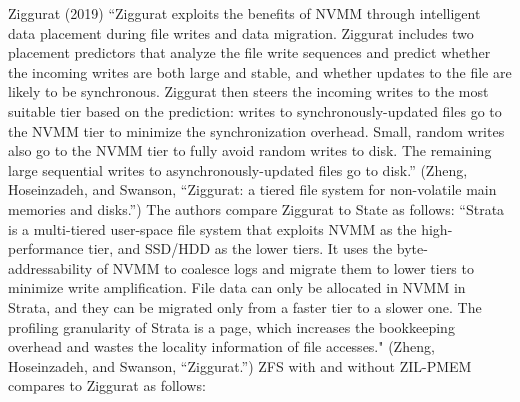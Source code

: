 \documentclass[12pt,a4paper,twoside,draft]{book}
\begin{document}
Ziggurat (2019)
  “Ziggurat exploits the benefits of NVMM through intelligent data placement during file writes and data migration.
  Ziggurat includes two placement predictors that analyze the file write sequences and predict whether the incoming writes are both large and stable, and whether updates to the file are likely to be synchronous.
  Ziggurat then steers the incoming writes to the most suitable tier based on the prediction: writes to synchronously-updated files go to the NVMM tier to minimize the synchronization overhead.
  Small, random writes also go to the NVMM tier to fully avoid random writes to disk. The remaining large sequential writes to asynchronously-updated files go to disk.”
  (Zheng, Hoseinzadeh, and Swanson, “Ziggurat: a tiered file system for non-volatile main memories and disks.”)
The authors compare Ziggurat to State as follows:
  “Strata is a multi-tiered user-space file system that exploits NVMM as the high-performance tier, and SSD/HDD as the lower tiers.
  It uses the byte-addressability of NVMM to coalesce logs and migrate them to lower tiers to minimize write amplification.
  File data can only be allocated in NVMM in Strata, and they can be migrated only from a faster tier to a slower one.
  The profiling granularity of Strata is a page, which increases the bookkeeping overhead and wastes the locality information of file accesses."
  (Zheng, Hoseinzadeh, and Swanson, “Ziggurat.”)
ZFS with and without ZIL-PMEM compares to Ziggurat as follows:
\end{document}
